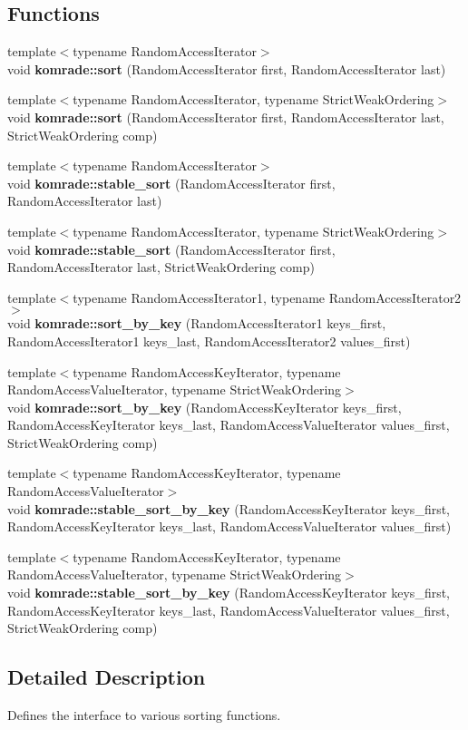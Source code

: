 \subsection*{Functions}
\begin{CompactItemize}
\item 
{\footnotesize template$<$typename RandomAccessIterator$>$ }\\void {\bf komrade::sort} (RandomAccessIterator first, RandomAccessIterator last)
\item 
{\footnotesize template$<$typename RandomAccessIterator, typename StrictWeakOrdering$>$ }\\void {\bf komrade::sort} (RandomAccessIterator first, RandomAccessIterator last, StrictWeakOrdering comp)
\item 
{\footnotesize template$<$typename RandomAccessIterator$>$ }\\void {\bf komrade::stable\_\-sort} (RandomAccessIterator first, RandomAccessIterator last)
\item 
{\footnotesize template$<$typename RandomAccessIterator, typename StrictWeakOrdering$>$ }\\void {\bf komrade::stable\_\-sort} (RandomAccessIterator first, RandomAccessIterator last, StrictWeakOrdering comp)
\item 
{\footnotesize template$<$typename RandomAccessIterator1, typename RandomAccessIterator2$>$ }\\void {\bf komrade::sort\_\-by\_\-key} (RandomAccessIterator1 keys\_\-first, RandomAccessIterator1 keys\_\-last, RandomAccessIterator2 values\_\-first)
\item 
{\footnotesize template$<$typename RandomAccessKeyIterator, typename RandomAccessValueIterator, typename StrictWeakOrdering$>$ }\\void {\bf komrade::sort\_\-by\_\-key} (RandomAccessKeyIterator keys\_\-first, RandomAccessKeyIterator keys\_\-last, RandomAccessValueIterator values\_\-first, StrictWeakOrdering comp)
\item 
{\footnotesize template$<$typename RandomAccessKeyIterator, typename RandomAccessValueIterator$>$ }\\void {\bf komrade::stable\_\-sort\_\-by\_\-key} (RandomAccessKeyIterator keys\_\-first, RandomAccessKeyIterator keys\_\-last, RandomAccessValueIterator values\_\-first)
\item 
{\footnotesize template$<$typename RandomAccessKeyIterator, typename RandomAccessValueIterator, typename StrictWeakOrdering$>$ }\\void {\bf komrade::stable\_\-sort\_\-by\_\-key} (RandomAccessKeyIterator keys\_\-first, RandomAccessKeyIterator keys\_\-last, RandomAccessValueIterator values\_\-first, StrictWeakOrdering comp)
\end{CompactItemize}


\subsection{Detailed Description}
Defines the interface to various sorting functions. 

